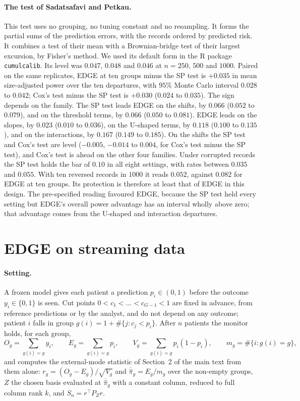 \documentclass[11pt]{article}
\newcommand{\pibar}{\overline{\hat{\pi}}}
\begin{document}
\paragraph{The test of Sadatsafavi and Petkau.} This test uses no grouping, no tuning constant and no
resampling. It forms the partial sums of the prediction errors, with the records ordered by predicted
risk. It combines a test of their mean with a Brownian-bridge test of their largest excursion, by
Fisher's method. We used its default form in the R package \texttt{cumulcalib}. Its level was $0.047$,
$0.048$ and $0.046$ at $n=250$, $500$ and $1000$. Paired on the same replicates, EDGE at ten groups
minus the SP test is $+0.035$ in mean size-adjusted power over the ten departures, with $95\%$ Monte Carlo
interval $0.028$ to $0.042$; Cox's test minus the SP test is $+0.030$ ($0.024$ to $0.035$). The sign
depends on the family. The SP test leads EDGE on the shifts, by $0.066$ ($0.052$ to $0.079$), and on the
threshold terms, by $0.066$ ($0.050$ to $0.081$). EDGE leads on the slopes, by $0.023$ ($0.010$ to $0.036$),
on the U-shaped terms, by $0.118$ ($0.100$ to $0.135$), and on the interactions, by $0.167$ ($0.149$ to
$0.185$). On the shifts the SP test and Cox's test are level ($-0.005$, $-0.014$ to $0.004$, for Cox's test
minus the SP test), and Cox's test is ahead on the other four families. Under corrupted records the SP test
holds the bar of $0.10$ in all eight settings, with rates between $0.035$ and $0.055$. With ten reversed
records in $1000$ it reads $0.052$, against $0.082$ for EDGE at ten groups. Its protection is therefore at
least that of EDGE in this design. The pre-specified reading favoured EDGE, because the SP test held every
setting but EDGE's overall power advantage has an interval wholly above zero; that advantage comes from
the U-shaped and interaction departures.



\section{EDGE on streaming data}\label{si:stream}

\paragraph{Setting.} A frozen model gives each patient a prediction $p_i\in(0,1)$ before the outcome
$y_i\in\{0,1\}$ is seen. Cut points $0<c_1<\dots<c_{G-1}<1$ are fixed in advance, from reference
predictions or by the analyst, and do not depend on any outcome; patient $i$ falls in group
$g(i)=1+\#\{j:c_j<p_i\}$. After $n$ patients the monitor holds, for each group,
\[
O_g=\sum_{g(i)=g}y_i,\qquad E_g=\sum_{g(i)=g}p_i,\qquad V_g=\sum_{g(i)=g}p_i(1-p_i),\qquad m_g=\#\{i:g(i)=g\},
\]
and computes the external-mode statistic of Section~2 of the main text from them alone:
$r_g=(O_g-E_g)/\sqrt{V_g}$ and $\pibar_g=E_g/m_g$ over the non-empty groups, $Z$ the chosen basis evaluated
at $\pibar_g$ with a constant column, reduced to full column rank $k$, and $S_n=r^\top P_Z r$.
\end{document}

